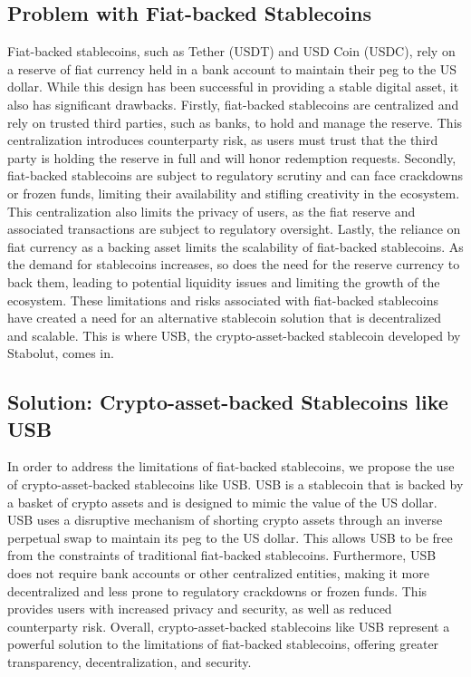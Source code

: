 \subsection{Problem with Fiat-backed Stablecoins} %
Fiat-backed stablecoins, such as Tether (USDT) and USD Coin (USDC), rely on a reserve of fiat currency held in a bank account to maintain their peg to the US dollar.
While this design has been successful in providing a stable digital asset, it also has significant drawbacks.\newline
Firstly, fiat-backed stablecoins are centralized and rely on trusted third parties, such as banks, to hold and manage the reserve.
This centralization introduces counterparty risk, as users must trust that the third party is holding the reserve in full and will honor redemption requests.\newline
Secondly, fiat-backed stablecoins are subject to regulatory scrutiny and can face crackdowns or frozen funds, limiting their availability and stifling creativity in the ecosystem.
This centralization also limits the privacy of users, as the fiat reserve and associated transactions are subject to regulatory oversight.\newline
Lastly, the reliance on fiat currency as a backing asset limits the scalability of fiat-backed stablecoins.
As the demand for stablecoins increases, so does the need for the reserve currency to back them, leading to potential liquidity issues and limiting the growth of the ecosystem.\newline
These limitations and risks associated with fiat-backed stablecoins have created a need for an alternative stablecoin solution that is decentralized and scalable.
This is where USB, the crypto-asset-backed stablecoin developed by Stabolut, comes in.


\subsection{Solution: Crypto-asset-backed Stablecoins like USB}
In order to address the limitations of fiat-backed stablecoins, we propose the use of crypto-asset-backed stablecoins like USB.
USB is a stablecoin that is backed by a basket of crypto assets and is designed to mimic the value of the US dollar.\newline
USB uses a disruptive mechanism of shorting crypto assets through an inverse perpetual swap to maintain its peg to the US dollar.
This allows USB to be free from the constraints of traditional fiat-backed stablecoins.\newline
Furthermore, USB does not require bank accounts or other centralized entities, making it more decentralized and less prone to regulatory crackdowns or frozen funds.
This provides users with increased privacy and security, as well as reduced counterparty risk.\newline
Overall, crypto-asset-backed stablecoins like USB represent a powerful solution to the limitations of fiat-backed stablecoins, offering greater transparency, decentralization, and security.


